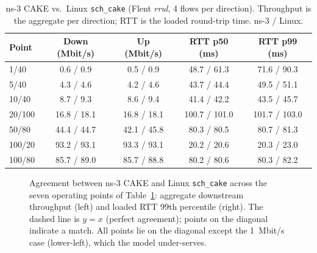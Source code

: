 \documentclass[sigconf,nonacm]{acmart}
\begin{document}
\begin{table}[t]
\caption{ns-3 CAKE vs.\ Linux \texttt{sch\_cake} (Flent \emph{rrul}, 4 flows per
direction). Throughput is the aggregate per direction; RTT is the loaded
round-trip time. ns-3 / Linux.}
\label{tab:validation}
\small
\begin{tabular}{@{}lcccc@{}}
\toprule
Point & Down (Mbit/s) & Up (Mbit/s) & RTT p50 (ms) & RTT p99 (ms)\\
\midrule
1/40    & 0.6 / 0.9   & 0.5 / 0.9   & 48.7 / 61.3 & 71.6 / 90.3\\
5/40    & 4.3 / 4.6   & 4.2 / 4.6   & 43.7 / 44.4 & 49.5 / 51.1\\
10/40   & 8.7 / 9.3   & 8.6 / 9.4   & 41.4 / 42.2 & 43.5 / 45.7\\
20/100  & 16.8 / 18.1 & 16.8 / 18.1 & 100.7 / 101.0 & 101.7 / 103.0\\
50/80   & 44.4 / 44.7 & 42.1 / 45.8 & 80.3 / 80.5 & 80.7 / 81.3\\
100/20  & 93.2 / 93.1 & 93.3 / 93.1 & 20.2 / 20.6 & 20.3 / 23.0\\
100/80  & 85.7 / 89.0 & 85.7 / 88.8 & 80.2 / 80.6 & 80.3 / 82.2\\
\bottomrule
\end{tabular}
\end{table}

\begin{figure}[t]
\centering
{}\hfill
{}
\caption{Agreement between ns-3 CAKE and Linux \texttt{sch\_cake} across the seven
operating points of Table~\ref{tab:validation}: aggregate downstream throughput
(left) and loaded RTT 99th percentile (right). The dashed line is $y=x$ (perfect
agreement); points on the diagonal indicate a match. All points lie on the
diagonal except the 1~Mbit/s case (lower-left), which the model under-serves.}
\label{fig:validation}
\end{figure}
\end{document}

